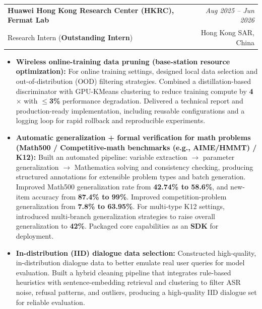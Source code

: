 \documentclass[11pt,a4paper]{article}
\makeatletter
\newcommand{\Entry}[5][0.16em]{%
\begin{tabularx}{\linewidth}{@{}Xr@{}}
\textbf{#2} & \textit{#3}\\
{\small #4} & {\small #5}
\end{tabularx}\vspace{#1}
}
\makeatother
\begin{document}
\Entry{Huawei Hong Kong Research Center (HKRC), Fermat Lab}{Aug 2025 -- Jun 2026}{Research Intern (\textbf{Outstanding Intern})}{Hong Kong SAR, China}
\begin{itemize}
    \item \textbf{Wireless online-training data pruning (base-station resource optimization):}
    For online training settings, designed local data selection and out-of-distribution (OOD) filtering strategies. Combined a distillation-based discriminator with GPU-KMeans clustering to reduce training compute by \textbf{4$\times$} with \textbf{$\le$3\%} performance degradation. Delivered a technical report and production-ready implementation, including reusable configurations and a logging loop for rapid rollback and reproducible experiments.
    \item \textbf{Automatic generalization + formal verification for math problems (Math500 / Competitive-math benchmarks (e.g., AIME/HMMT) / K12):}
    Built an automated pipeline: variable extraction $\rightarrow$ parameter generalization $\rightarrow$ Mathematica solving and consistency checking, producing structured annotations for extensible problem types and batch generation. Improved Math500 generalization rate from \textbf{42.74\% to 58.6\%}, and new-item accuracy from \textbf{87.4\% to 99\%}. Improved competition-problem generalization from \textbf{7.8\% to 63.95\%}. For multi-type K12 settings, introduced multi-branch generalization strategies to raise overall generalization to \textbf{42\%}. Packaged core capabilities as an \textbf{SDK} for deployment.
    \item \textbf{In-distribution (IID) dialogue data selection:}
    Constructed high-quality, in-distribution dialogue data to better emulate real user queries for model evaluation. Built a hybrid cleaning pipeline that integrates rule-based heuristics with sentence-embedding retrieval and clustering to filter ASR noise, refusal patterns, and outliers, producing a high-quality IID dialogue set for reliable evaluation.
\end{itemize}
\end{document}
